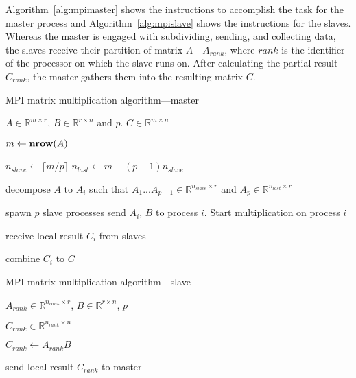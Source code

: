 Algorithm~\ref{alg:mpimaster} shows the instructions to accomplish the
task for the master process and Algorithm~\ref{alg:mpislave} shows the
instructions for the slaves. Whereas the master is engaged with
subdividing, sending, and collecting data, the slaves receive their
partition of matrix $A$---$A_{rank}$, where $rank$ is the identifier of
the processor on which the slave runs on. After calculating the
partial result $C_{rank}$, the master gathers them into the resulting
matrix $C$.  

\begin{algorithm}
\caption{MPI matrix multiplication algorithm---master}
\label{alg:mpimaster}
\begin{algorithmic}[1]

  \REQUIRE $A \in \mathbb{R}^{m \times r}$, $B \in \mathbb{R}^{r
    \times n}$ and $p$.
  \ENSURE $C \in \mathbb{R}^{m \times n}$

  \STATE $m \leftarrow \textbf{nrow} (A)$
  
  \STATE $n_{slave} \leftarrow \lceil m/p \rceil$
  \STATE $n_{last} \leftarrow m - (p - 1) n_{slave} $
  
  \STATE decompose $A$ to $A_i$ such that $A_1 ... A_{p-1} \in
  \mathbb{R}^{n_{slave} \times r}$ and $A_p \in \mathbb{R}^{n_{last} \times r} $  
  
  \STATE spawn $p$ slave processes
    \STATE send $A_i$, $B$ to process $i$. Start
    multiplication on process $i$ 
  \ENDFOR
  
    \STATE receive local result $C_{i}$ from slaves
  \ENDFOR
  
  \STATE combine $C_{i}$ to $C$

\end{algorithmic}
\end{algorithm}

\begin{algorithm}
\caption{MPI matrix multiplication algorithm---slave}
\label{alg:mpislave}
\begin{algorithmic}[1]

  \REQUIRE $ A_{rank} \in \mathbb{R}^{n_{rank} \times r}$, $B
  \in \mathbb{R}^{r\times n}$, $p$

  \ENSURE $C_{rank} \in \mathbb{R}^{n_{rank} \times n}$

  \STATE $C_{rank} \leftarrow A_{rank}B$

  \STATE send local result $C_{rank}$ to master
  
\end{algorithmic}
\end{algorithm}


